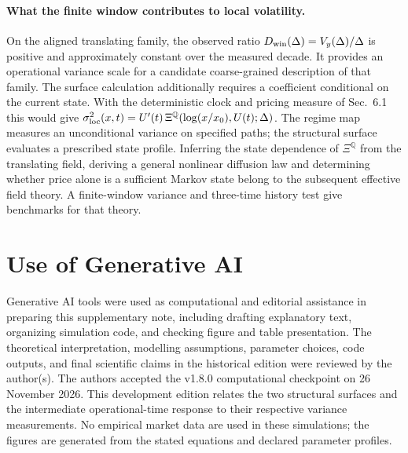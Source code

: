\documentclass[11pt]{article}
\begin{document}
\paragraph{What the finite window contributes to local volatility.}
On the aligned translating family, the observed ratio
\(D_{\rm win}(\Delta)=V_y(\Delta)/\Delta\) is positive and approximately
constant over the measured decade. It provides an operational variance
scale for a candidate coarse-grained description of that family.
The surface calculation additionally requires a coefficient conditional
on the current state. With the deterministic clock and pricing measure
of Sec.~6.1 this would give
\(\sigma_{\rm loc}^2(x,t)=U'(t)\,\Xi^{\mathbb Q}(\log(x/x_0),U(t);\Delta)\).
The regime map measures an unconditional variance on specified paths;
the structural surface evaluates a prescribed state profile. Inferring
the state dependence of \(\Xi^{\mathbb Q}\) from the translating field,
deriving a general nonlinear diffusion law and determining whether price
alone is a sufficient Markov state belong to the subsequent effective
field theory. A finite-window variance and three-time history test give
benchmarks for that theory.

\section*{Use of Generative AI}

Generative AI tools were used as computational and editorial assistance in
preparing this supplementary note, including drafting explanatory text,
organizing simulation code, and checking figure and table presentation. The
theoretical interpretation, modelling assumptions, parameter choices, code
outputs, and final scientific claims in the historical edition were reviewed by the author(s). The authors accepted the v1.8.0 computational checkpoint on 26 November 2026. This development edition relates the two structural surfaces and the intermediate operational-time response to their respective variance measurements. No empirical market data are used in
these simulations; the figures are generated from the stated equations and
declared parameter profiles.
\end{document}
